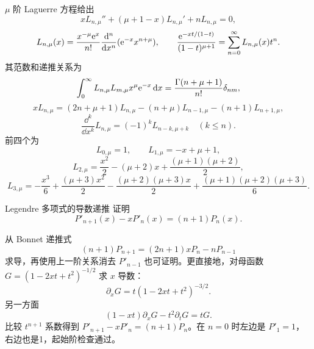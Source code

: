 $\mu$ 阶 Laguerre 方程给出
\[
 xL_{n,\mu}''+(\mu+1-x)L_{n,\mu}'+nL_{n,\mu}=0,
\]
\[
 L_{n,\mu}(x)=\frac{x^{-\mu}\mathrm e^x}{n!}
 \frac{\mathop{}\!\mathrm d^n}{\mathop{}\!\mathrm d x^n}(\mathrm e^{-x}x^{n+\mu}),\qquad
 \frac{\mathrm e^{-xt/(1-t)}}{(1-t)^{\mu+1}}
 =\sum_{n=0}^\infty L_{n,\mu}(x)t^n.
\]
其范数和递推关系为
\[
 \int_0^\infty L_{n,\mu}L_{m,\mu}x^\mu\mathrm e^{-x}\mathop{}\!\mathrm d x
 =\frac{\Gamma(n+\mu+1)}{n!}\delta_{nm},
\]
\[
 xL_{n,\mu}=(2n+\mu+1)L_{n,\mu}
 -(n+\mu)L_{n-1,\mu}-(n+1)L_{n+1,\mu},
\]
\[
 \frac{\dd^k}{\dd x^k}L_{n,\mu}=(-1)^kL_{n-k,\mu+k}\quad(k\le n).
\]
前四个为
\[
 L_{0,\mu}=1,\qquad L_{1,\mu}=-x+\mu+1,
\]
\[
 L_{2,\mu}=\frac{x^2}{2}-(\mu+2)x+\frac{(\mu+1)(\mu+2)}2,
\]
\[
 L_{3,\mu}=-\frac{x^3}{6}+\frac{(\mu+3)x^2}{2}
 -\frac{(\mu+2)(\mu+3)x}{2}
 +\frac{(\mu+1)(\mu+2)(\mu+3)}6.
\]

\begin{center}\begin{minipage}{\linewidth}\centering
\centering
{}
\label{advA3:fig:laguerre}
\end{minipage}\end{center}

\begin{advexamplebox}{Legendre 多项式的导数递推}\label{advA3:ex:legendre-derivative-recurrence}
证明
\[
 P'_{n+1}(x)-xP'_n(x)=(n+1)P_n(x).
\]

\AQLegendreRecurrence
\end{advexamplebox}
\begin{advsolution}
\AALegendreRecurrence

从 Bonnet 递推式
\[
 (n+1)P_{n+1}=(2n+1)xP_n-nP_{n-1}
\]
求导，再使用上一阶关系消去 $P'_{n-1}$ 也可证明。更直接地，对母函数
$G=(1-2xt+t^2)^{-1/2}$ 求 $x$ 导数：
\[
 \partial_xG=t(1-2xt+t^2)^{-3/2}.
\]
另一方面
\[
 (1-xt)\partial_xG-t^2\partial_tG=tG.
\]
比较 $t^{n+1}$ 系数得到
$P'_{n+1}-xP'_n=(n+1)P_n$。在 $n=0$ 时左边是 $P'_1=1$，右边也是1，起始阶检查通过。
\end{advsolution}

